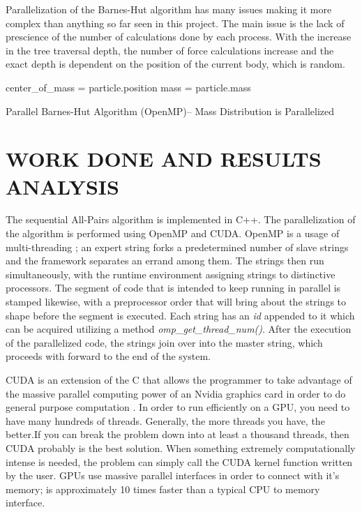 Parallelization of the Barnes-Hut algorithm has many issues making it more complex than anything so far seen in this project. The main issue is the lack of prescience of the number of calculations done by each process. With the increase in the tree traversal depth, the number of force calculations increase and the exact depth is dependent on the position of the current body, which is random. 

\begin{algorithm}
\DontPrintSemicolon
{}
 {
   {
    center\_of\_mass = particle.position \;
    mass = particle.mass \;
  }
}
\label{algo:6}
\caption{Parallel Barnes-Hut Algorithm (OpenMP){--} Mass Distribution is Parallelized}
\end{algorithm}

\section{WORK DONE AND RESULTS ANALYSIS}

The sequential  All-Pairs algorithm is implemented in C++. The parallelization of the algorithm is performed using OpenMP and CUDA. OpenMP is a usage of multi-threading \cite{c11}; an expert string forks a predetermined number of slave strings and the framework separates an errand among them. The strings then run simultaneously, with the runtime environment assigning strings to distinctive processors. The segment of code that is intended to keep running in parallel is stamped likewise, with a preprocessor order that will bring about the strings to shape before the segment is executed. Each string has an \textit{id} appended to it which can be acquired utilizing a method \textit{omp\_get\_thread\_num()}. After the execution of the parallelized code, the strings join over into the master string, which proceeds with forward to the end of the system. \par

CUDA is an extension of the C that allows the programmer to take advantage of the massive parallel computing power of an Nvidia graphics card in order to do general purpose computation \cite{c12}. In order to run efficiently on a GPU, you need to have many hundreds of threads. Generally, the more threads you have, the better.If you can break the problem down into at least a thousand threads, then CUDA probably is the best solution. When something extremely computationally intense is needed, the problem can simply call the CUDA kernel function written by the user. GPUs use massive parallel interfaces in order to connect with it’s memory; is approximately 10 times faster than a typical CPU to memory interface. \par

